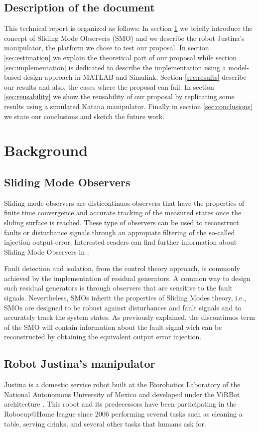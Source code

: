 \documentclass[a4paper, 10pt]{article}
\begin{document}
\subsection{Description of the document}
This technical report is organized as follows: In section \ref{sec:background} we briefly introduce the concept of Sliding Mode Observers (SMO) and we describe the robot Justina's manipulator, the platform we chose to test our proposal. In section \ref{sec:estimation} we explain the theoretical part of our proposal while section \ref{sec:implementation} is dedicated to describe the implementation using a model-based design approach in MATLAB and Simulink. Section \ref{sec:results} describe our results and also, the cases where the proposal can fail. In section \ref{sec:reusability} we show the reusability of our proposal by replicating some results using a simulated Katana manipulator. Finally in section \ref{sec:conclusions} we state our conclusions and sketch the future work. 
\section{Background}
\label{sec:background}
\subsection{Sliding Mode Observers}
Sliding mode observers are disticontinuos observers that have the properties of finite time convergence and accurate tracking of the measured states once the sliding surface is reached. These type of observers can be used to reconstruct faults or disturbance signals through an appropiate filtering of the so-called injection output error. Interested readers can find further information about Sliding Mode Observers in \cite{shtessel2014sliding,davila2005second,fridman2002higher}.

Fault detection and isolation, from the control theory approach, is commonly achieved by the implementation of residual generators. A common way to design such residual generators is through observers that are sensitive to the fault signals. Nevertheless, SMOs inherit the properties of Sliding Modes theory, i.e., SMOs are designed to be robust against disturbances and fault signals and to accurately track the system states. As previously explained, the discontinuos term of the SMO will contain information about the fault signal wich can be reconstructed by obtaining the equivalent output error injection. 

\subsection{Robot Justina's manipulator}
Justina is a domestic service robot built at the Biorobotics Laboratory of the National Autonomous University of Mexico and developed under the ViRBot architecture \cite{savage2008virbot}. This robot and its predecessors have been participating in the Robocup@Home league \cite{wachsmuth2015robocup} since 2006 performing several tasks such as cleaning a table, serving drinks, and several other tasks that humans ask for. 
\end{document}
